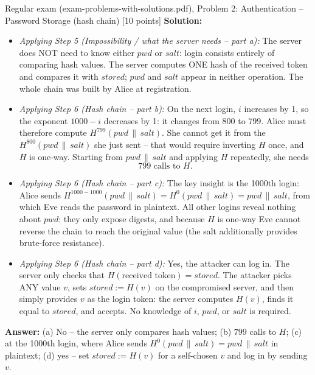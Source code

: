 \documentclass[12pt, a4paper]{article}
\begin{document}
\begin{practicebox}{Regular exam (exam-problems-with-solutions.pdf), Problem 2: Authentication -- Password Storage (hash chain) [10 points]}
\textbf{Solution:}
\begin{itemize}
    \item \textit{Applying Step 5 (Impossibility / what the server needs -- part a):} The server does NOT need to know either $pwd$ or $salt$: login consists entirely of comparing hash values. The server computes ONE hash of the received token and compares it with $stored$; $pwd$ and $salt$ appear in neither operation. The whole chain was built by Alice at registration.
    \item \textit{Applying Step 6 (Hash chain -- part b):} On the next login, $i$ increases by 1, so the exponent $1000 - i$ decreases by 1: it changes from $800$ to $799$. Alice must therefore compute $H^{799}(pwd \,\|\, salt)$. She cannot get it from the $H^{800}(pwd \,\|\, salt)$ she just sent -- that would require inverting $H$ once, and $H$ is one-way. Starting from $pwd \,\|\, salt$ and applying $H$ repeatedly, she needs \[ 799 \text{ calls to } H. \]
    \item \textit{Applying Step 6 (Hash chain -- part c):} The key insight is the 1000th login: Alice sends $H^{1000-1000}(pwd \,\|\, salt) = H^{0}(pwd \,\|\, salt) = pwd \,\|\, salt$, from which Eve reads the password in plaintext. All other logins reveal nothing about $pwd$: they only expose digests, and because $H$ is one-way Eve cannot reverse the chain to reach the original value (the salt additionally provides brute-force resistance).
    \item \textit{Applying Step 6 (Hash chain -- part d):} Yes, the attacker can log in. The server only checks that $H(\text{received token}) = stored$. The attacker picks ANY value $v$, sets $stored := H(v)$ on the compromised server, and then simply provides $v$ as the login token: the server computes $H(v)$, finds it equal to $stored$, and accepts. No knowledge of $i$, $pwd$, or $salt$ is required.
\end{itemize}
\textbf{Answer:} (a) No -- the server only compares hash values; (b) $799$ calls to $H$; (c) at the 1000th login, where Alice sends $H^{0}(pwd \,\|\, salt) = pwd \,\|\, salt$ in plaintext; (d) yes -- set $stored := H(v)$ for a self-chosen $v$ and log in by sending $v$.
\end{practicebox}
\end{document}

